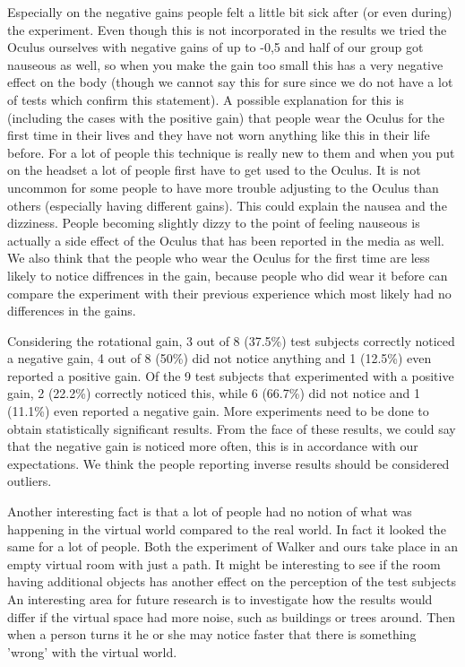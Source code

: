 Especially on the negative gains people felt a little bit sick after (or even during) the experiment.
Even though this is not incorporated in the results we tried the Oculus ourselves with negative gains of up to -0,5 and half of our group got nauseous as well, so when you make the gain too small this has a very negative effect on the body (though we cannot say this for sure since we do not have a lot of tests which confirm this statement).
A possible explanation for this is (including the cases with the positive gain) that people wear the Oculus for the first time in their lives and they have not worn anything like this in their life before.
For a lot of people this technique is really new to them and when you put on the headset a lot of people first have to get used to the Oculus. 
It is not uncommon for some people to have more trouble adjusting to the Oculus than others (especially having different gains).
This could explain the nausea and the dizziness.
People becoming slightly dizzy to the point of feeling nauseous is actually a side effect of the Oculus that has been reported in the media as well.
We also think that the people who wear the Oculus  for the first time are less likely to notice diffrences in the gain, because people who did wear it before can compare the experiment with their previous experience which most likely had no differences in the gains. 

Considering the rotational gain, 3 out of 8 (37.5\%) test subjects correctly noticed a negative gain, 4 out of 8 (50\%) did not notice anything and 1 (12.5\%) even reported a positive gain.
Of the 9 test subjects that experimented with a positive gain, 2 (22.2\%) correctly noticed this, while 6 (66.7\%) did not notice and 1 (11.1\%) even reported a negative gain.
More experiments need to be done to obtain statistically significant results.
From the face of these results, we could say that the negative gain is noticed more often, this is in accordance with our expectations.
We think the people reporting inverse results should be considered outliers.

Another interesting fact is that a lot of people had no notion of what was happening in the virtual world compared to the real world.
In fact it looked the same for a lot of people.
Both the experiment of Walker \cite{jwalker} and ours take place in an empty virtual room with just a path.
It might be interesting to see if the room having additional objects has another effect on the perception of the test subjects
An interesting area for future research is to investigate how the results would differ if the virtual space had more noise, such as buildings or trees around.
Then when a person turns it he or she may notice faster that there is something 'wrong'  with the virtual world.


